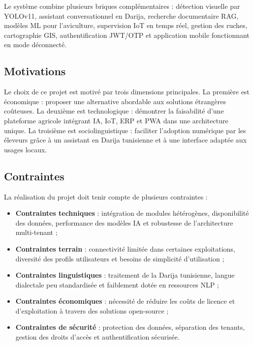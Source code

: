 Le système combine plusieurs briques complémentaires : détection visuelle par
YOLOv11, assistant conversationnel en Darija, recherche documentaire RAG,
modèles ML pour l'aviculture, supervision IoT en temps réel, gestion des ruches,
cartographie GIS, authentification JWT/OTP et application mobile fonctionnant en
mode déconnecté.

\subsection{Motivations}

Le choix de ce projet est motivé par trois dimensions principales. La première
est économique : proposer une alternative abordable aux solutions étrangères
coûteuses. La deuxième est technologique : démontrer la faisabilité d'une
plateforme agricole intégrant IA, IoT, ERP et PWA dans une architecture unique.
La troisième est sociolinguistique : faciliter l'adoption numérique par les
éleveurs grâce à un assistant en Darija tunisienne et à une interface adaptée
aux usages locaux.

\subsection{Contraintes}

La réalisation du projet doit tenir compte de plusieurs contraintes :
\begin{itemize}
  \item \textbf{Contraintes techniques} : intégration de modules hétérogènes,
        disponibilité des données, performance des modèles IA et robustesse de
        l'architecture multi-tenant ;
  \item \textbf{Contraintes terrain} : connectivité limitée dans certaines
        exploitations, diversité des profils utilisateurs et besoins de
        simplicité d'utilisation ;
  \item \textbf{Contraintes linguistiques} : traitement de la Darija tunisienne,
        langue dialectale peu standardisée et faiblement dotée en ressources NLP ;
  \item \textbf{Contraintes économiques} : nécessité de réduire les coûts de
        licence et d'exploitation à travers des solutions open-source ;
  \item \textbf{Contraintes de sécurité} : protection des données, séparation
        des tenants, gestion des droits d'accès et authentification sécurisée.
\end{itemize}


